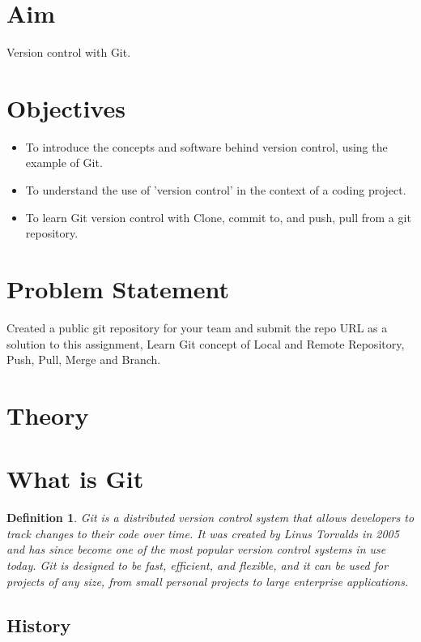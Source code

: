 \documentclass[11pt]{article}
\newtheorem{dfn}[thm]{Definition}
\begin{document}
\tableofcontents
\thispagestyle{empty}
\clearpage

\setcounter{page}{1}

\section{Aim}
Version control with Git.
\section{Objectives}
\begin{itemize}
    \item To introduce the concepts and software behind version control, using the example of Git.
    \item To understand the use of 'version control' in the context of a coding project.
    \item To learn Git version control with Clone, commit to, and push, pull from a git repository.
\end{itemize}

\section{Problem Statement}
Created a public git repository for your team and submit the repo URL as a solution to this
assignment, Learn Git concept of Local and Remote Repository, Push, Pull, Merge and Branch.



\section{Theory}

\section{What is Git}

\begin{dfn}
    Git is a distributed version control system that allows developers to track changes to their code over time. It was created by Linus Torvalds in 2005 and has since become one of the most popular version control systems in use today. Git is designed to be fast, efficient, and flexible, and it can be used for projects of any size, from small personal projects to large enterprise applications.
\end{dfn}

\subsection{History}
\end{document}
